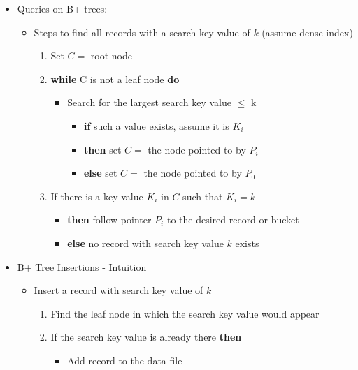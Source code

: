 \begin{itemize}[label=\(\rhd\)]
\item Queries on B+ trees:
\begin{itemize}[label=\(\rhd\)]
    \item Steps to find all records with a search key value of $k$ (assume dense index)
    \begin{enumerate}
        \item Set $C=$ root node
        \item \textbf{while} C is not a leaf node \textbf{do}
        \begin{itemize}[label=\(\rhd\)]
            \item[] Search for the largest search key value $\leq$ k
            \begin{itemize}[label=\(\rhd\)]
                \item[] \textbf{if} such a value exists, assume it is $K_i$
                \item[] \textbf{then} set $C=$ the node pointed to by $P_i$
                \item [] \textbf{else} set $C= $ the node pointed to by $P_0$
            \end{itemize}
        \end{itemize}
        \item If there is a key value $K_i$ in $C$ such that $K_i=k$
        \begin{itemize}[label=\(\rhd\)]
            \item[] \textbf{then} follow pointer $P_i$ to the desired record or bucket
            \item[] \textbf{else} no record with search key value $k$ exists
        \end{itemize}
    \end{enumerate}
\end{itemize}
    \item B+ Tree Insertions - Intuition
    \begin{itemize}[label=\(\rhd\)]
    \item Insert a record with search key value of $k$
    \begin{enumerate}[left=0pt, itemsep=1ex, label=\textcolor{black}{\arabic*.}, font=\bfseries]
        \item Find the leaf node in which the search key value would appear
        \item If the search key value is already there \textbf{then}
        \begin{itemize}[label=\(\rhd\)]
            \item[] Add record to the data file

\end{itemize}
\end{enumerate}
\end{itemize}
\end{itemize}
